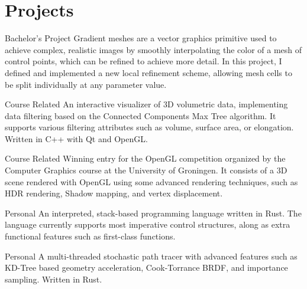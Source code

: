 \section*{Projects}
{Bachelor's Project} %
{} %
{} %
{%
    Gradient meshes are a vector graphics primitive used to achieve complex, realistic images by smoothly interpolating the color of a mesh of control points, which can be refined to achieve more detail. In this project, I defined and implemented a new local refinement scheme, allowing mesh cells to be split individually at any parameter value.
}

{Course Related} %
{} %
{} %
{%
    An interactive visualizer of 3D volumetric data, implementing data filtering based on the Connected Components Max Tree algorithm. It supports various filtering attributes such as volume, surface area, or elongation. Written in C++ with Qt and OpenGL.
}

{Course Related} %
{} %
{} %
{%
    Winning entry for the OpenGL competition organized by the Computer Graphics course at the University of Groningen. It consists of a 3D scene rendered with OpenGL using some advanced rendering techniques, such as HDR rendering, Shadow mapping, and vertex displacement.
}

{Personal} %
{} %
{} %
{%
    An interpreted, stack-based programming language written in Rust. The language currently supports most imperative control structures, along as extra functional features such as first-class functions.
}

{Personal} %
{} %
{} %
{%
    A multi-threaded stochastic path tracer with advanced features such as KD-Tree based geometry acceleration, Cook-Torrance BRDF, and importance sampling. Written in Rust.
}
